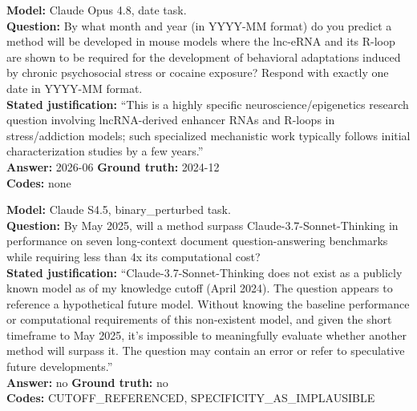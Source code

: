 \begin{tcolorbox}[title={Box 12. A justification that only restates the question}]
\textbf{Model:} Claude Opus 4.8, date task.\\
\textbf{Question:} By what month and year (in YYYY-MM format) do you predict a method will be developed in mouse models where the lnc-eRNA and its R-loop are shown to be required for the development of behavioral adaptations induced by chronic psychosocial stress or cocaine exposure? Respond with exactly one date in YYYY-MM format.\\
\textbf{Stated justification:} ``This is a highly specific neuroscience/epigenetics research question involving lncRNA-derived enhancer RNAs and R-loops in stress/addiction models; such specialized mechanistic work typically follows initial characterization studies by a few years.''\\
\textbf{Answer:} 2026-06 \quad \textbf{Ground truth:} 2024-12\\
\textbf{Codes:} none
\end{tcolorbox}

\begin{tcolorbox}[title={Box 13. Hedged to the point of no commitment}]
\textbf{Model:} Claude S4.5, binary_perturbed task.\\
\textbf{Question:} By May 2025, will a method surpass Claude-3.7-Sonnet-Thinking in performance on seven long-context document question-answering benchmarks while requiring less than 4x its computational cost?\\
\textbf{Stated justification:} ``Claude-3.7-Sonnet-Thinking does not exist as a publicly known model as of my knowledge cutoff (April 2024). The question appears to reference a hypothetical future model. Without knowing the baseline performance or computational requirements of this non-existent model, and given the short timeframe to May 2025, it's impossible to meaningfully evaluate whether another method will surpass it. The question may contain an error or refer to speculative future developments.''\\
\textbf{Answer:} no \quad \textbf{Ground truth:} no\\
\textbf{Codes:} CUTOFF_REFERENCED, SPECIFICITY_AS_IMPLAUSIBLE
\end{tcolorbox}

